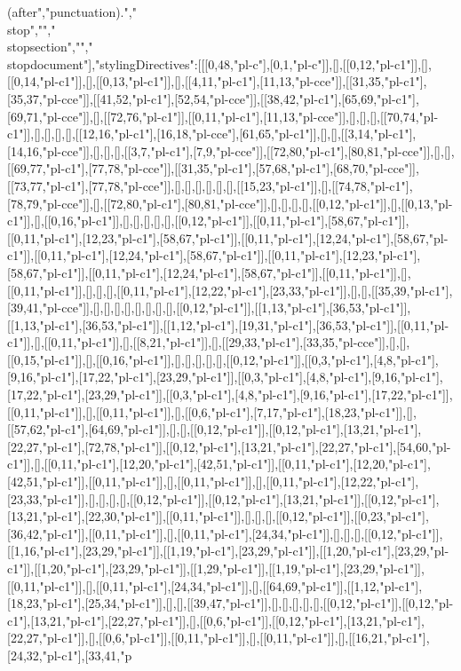 (after","punctuation).","\\stop","","\\stopsection","","\\stopdocument"],"stylingDirectives":[[[0,48,"pl-c"],[0,1,"pl-c"]],[],[[0,12,"pl-c1"]],[],[[0,14,"pl-c1"]],[],[[0,13,"pl-c1"]],[],[[4,11,"pl-c1"],[11,13,"pl-cce"]],[[31,35,"pl-c1"],[35,37,"pl-cce"]],[[41,52,"pl-c1"],[52,54,"pl-cce"]],[[38,42,"pl-c1"],[65,69,"pl-c1"],[69,71,"pl-cce"]],[],[[72,76,"pl-c1"]],[[0,11,"pl-c1"],[11,13,"pl-cce"]],[],[],[],[[70,74,"pl-c1"]],[],[],[],[],[[12,16,"pl-c1"],[16,18,"pl-cce"],[61,65,"pl-c1"]],[],[],[[3,14,"pl-c1"],[14,16,"pl-cce"]],[],[],[],[[3,7,"pl-c1"],[7,9,"pl-cce"]],[[72,80,"pl-c1"],[80,81,"pl-cce"]],[],[],[[69,77,"pl-c1"],[77,78,"pl-cce"]],[[31,35,"pl-c1"],[57,68,"pl-c1"],[68,70,"pl-cce"]],[[73,77,"pl-c1"],[77,78,"pl-cce"]],[],[],[],[],[],[],[[15,23,"pl-c1"]],[],[[74,78,"pl-c1"],[78,79,"pl-cce"]],[],[[72,80,"pl-c1"],[80,81,"pl-cce"]],[],[],[],[],[[0,12,"pl-c1"]],[],[[0,13,"pl-c1"]],[],[[0,16,"pl-c1"]],[],[],[],[],[],[[0,12,"pl-c1"]],[[0,11,"pl-c1"],[58,67,"pl-c1"]],[[0,11,"pl-c1"],[12,23,"pl-c1"],[58,67,"pl-c1"]],[[0,11,"pl-c1"],[12,24,"pl-c1"],[58,67,"pl-c1"]],[[0,11,"pl-c1"],[12,24,"pl-c1"],[58,67,"pl-c1"]],[[0,11,"pl-c1"],[12,23,"pl-c1"],[58,67,"pl-c1"]],[[0,11,"pl-c1"],[12,24,"pl-c1"],[58,67,"pl-c1"]],[[0,11,"pl-c1"]],[],[[0,11,"pl-c1"]],[],[],[],[[0,11,"pl-c1"],[12,22,"pl-c1"],[23,33,"pl-c1"]],[],[],[[35,39,"pl-c1"],[39,41,"pl-cce"]],[],[],[],[],[],[],[],[],[[0,12,"pl-c1"]],[[1,13,"pl-c1"],[36,53,"pl-c1"]],[[1,13,"pl-c1"],[36,53,"pl-c1"]],[[1,12,"pl-c1"],[19,31,"pl-c1"],[36,53,"pl-c1"]],[[0,11,"pl-c1"]],[],[[0,11,"pl-c1"]],[],[[8,21,"pl-c1"]],[],[[29,33,"pl-c1"],[33,35,"pl-cce"]],[],[],[[0,15,"pl-c1"]],[],[[0,16,"pl-c1"]],[],[],[],[],[],[[0,12,"pl-c1"]],[[0,3,"pl-c1"],[4,8,"pl-c1"],[9,16,"pl-c1"],[17,22,"pl-c1"],[23,29,"pl-c1"]],[[0,3,"pl-c1"],[4,8,"pl-c1"],[9,16,"pl-c1"],[17,22,"pl-c1"],[23,29,"pl-c1"]],[[0,3,"pl-c1"],[4,8,"pl-c1"],[9,16,"pl-c1"],[17,22,"pl-c1"]],[[0,11,"pl-c1"]],[],[[0,11,"pl-c1"]],[],[[0,6,"pl-c1"],[7,17,"pl-c1"],[18,23,"pl-c1"]],[],[[57,62,"pl-c1"],[64,69,"pl-c1"]],[],[],[[0,12,"pl-c1"]],[[0,12,"pl-c1"],[13,21,"pl-c1"],[22,27,"pl-c1"],[72,78,"pl-c1"]],[[0,12,"pl-c1"],[13,21,"pl-c1"],[22,27,"pl-c1"],[54,60,"pl-c1"]],[],[[0,11,"pl-c1"],[12,20,"pl-c1"],[42,51,"pl-c1"]],[[0,11,"pl-c1"],[12,20,"pl-c1"],[42,51,"pl-c1"]],[[0,11,"pl-c1"]],[],[[0,11,"pl-c1"]],[],[[0,11,"pl-c1"],[12,22,"pl-c1"],[23,33,"pl-c1"]],[],[],[],[],[[0,12,"pl-c1"]],[[0,12,"pl-c1"],[13,21,"pl-c1"]],[[0,12,"pl-c1"],[13,21,"pl-c1"],[22,30,"pl-c1"]],[[0,11,"pl-c1"]],[],[],[],[[0,12,"pl-c1"]],[[0,23,"pl-c1"],[36,42,"pl-c1"]],[[0,11,"pl-c1"]],[],[[0,11,"pl-c1"],[24,34,"pl-c1"]],[],[],[],[[0,12,"pl-c1"]],[[1,16,"pl-c1"],[23,29,"pl-c1"]],[[1,19,"pl-c1"],[23,29,"pl-c1"]],[[1,20,"pl-c1"],[23,29,"pl-c1"]],[[1,20,"pl-c1"],[23,29,"pl-c1"]],[[1,29,"pl-c1"]],[[1,19,"pl-c1"],[23,29,"pl-c1"]],[[0,11,"pl-c1"]],[],[[0,11,"pl-c1"],[24,34,"pl-c1"]],[],[[64,69,"pl-c1"]],[[1,12,"pl-c1"],[18,23,"pl-c1"],[25,34,"pl-c1"]],[],[],[[39,47,"pl-c1"]],[],[],[],[],[],[[0,12,"pl-c1"]],[[0,12,"pl-c1"],[13,21,"pl-c1"],[22,27,"pl-c1"]],[],[[0,6,"pl-c1"]],[[0,12,"pl-c1"],[13,21,"pl-c1"],[22,27,"pl-c1"]],[],[[0,6,"pl-c1"]],[[0,11,"pl-c1"]],[],[[0,11,"pl-c1"]],[],[[16,21,"pl-c1"],[24,32,"pl-c1"],[33,41,"p